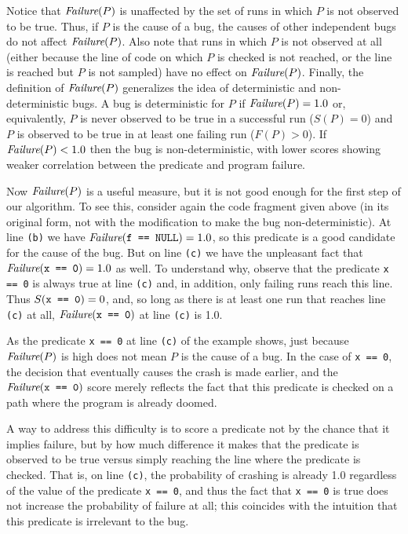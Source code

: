 Notice that $\textit{Failure}(P)$ is unaffected by the set of runs in which
$P$ is not observed to be true.  Thus, if $P$ is the cause of a bug, the
causes of other independent bugs do not affect $\textit{Failure}(P)$.
Also note that runs in which $P$ is not observed at all (either because
the line of code on which $P$ is checked is not reached, or the line is reached
but $P$ is not sampled) have no effect on $\textit{Failure}(P)$.
Finally, the definition of $\textit{Failure}(P)$
generalizes the idea of deterministic and non-deterministic bugs.  A
bug is deterministic for $P$ if $\textit{Failure}(P) = 1.0$ or, equivalently,
$P$ is never observed to be true in a successful run ($S(P) =
0$) and $P$ is observed to be true in at least one failing run ($F(P) > 0$).
If $\textit{Failure}(P) < 1.0$ then the bug is non-deterministic, with
lower scores showing weaker correlation between the predicate and
program failure.

Now $\textit{Failure}(P)$ is a useful measure, but it is not good
enough for the first step of our algorithm. To see this, consider again the
code fragment given above (in its original form, not with the
modification to make the bug non-deterministic).  At line {\tt (b)} we
have $\textit{Failure}(\mbox{\tt f == NULL}) = 1.0$, so this predicate is a good
candidate for the cause of the bug.
But on line {\tt (c)} we have the unpleasant fact that $\textit{Failure}(\mbox{\tt x == 0}) = 1.0$ as well.
To understand why, observe that the 
predicate \texttt{x == 0} is always true at line {\tt (c)} and, in
addition,
only failing runs reach this line.
Thus $S(\mbox{\tt x == 0}) = 0$, and, so long as there is at least one run that
reaches line {\tt (c)} at all, $\textit{Failure}(\mbox{\tt x == 0})$ at line {\tt (c)} is 1.0.

As the predicate {\tt x == 0} at line {\tt (c)} of the example
shows, just because $\textit{Failure}(P)$ is high does not
mean $P$ is the cause of a bug.  In the case of {\tt x == 0}, the
decision that eventually causes the crash is made earlier, and the
$\textit{Failure}(\mbox{\tt x == 0})$ score merely reflects the fact that this
predicate is checked on a path where the program is already doomed.


A way to address this difficulty is to score a predicate not by the chance
that it implies failure, but by how much difference it makes that the predicate
is observed to be true versus simply reaching the line where the predicate is checked.
That is, on line {\tt (c)}, the probability of crashing is already 1.0 regardless
of the value of the predicate {\tt x == 0}, and thus the fact that {\tt x == 0} is
true does not increase the probability of failure at all; this coincides with
the intuition that this predicate is irrelevant to the bug.


